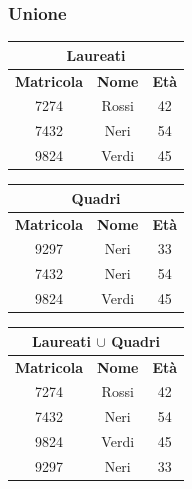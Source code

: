 \documentclass[../main.tex]{subfiles}
\begin{document}
	\subsubsection{Unione}
	\begin{center}
		\begin{tabular}{ |c|c|c| }
			\hline
			\multicolumn{3}{|c|}{\textbf{Laureati}}\\
			\hline
			\textbf{Matricola} & \textbf{Nome} & \textbf{Età}\\
			\hline
			7274 & Rossi & 42\\
			7432 & Neri & 54\\
			9824 & Verdi & 45\\
			\hline
		\end{tabular}
		\begin{tabular}{|c|c|c|}
			\hline
			\multicolumn{3}{|c|}{\textbf{Quadri}}\\
			\hline
			\textbf{Matricola} & \textbf{Nome} & \textbf{Età}\\
			\hline
			9297 & Neri & 33\\
			7432 & Neri & 54\\
			9824 & Verdi & 45\\
			\hline
		\end{tabular}
	\end{center}
	\begin{center}
		\begin{tabular}{|c|c|c|}
			\hline
			\multicolumn{3}{|c|}{\textbf{Laureati $\cup$ Quadri}}\\
			\hline
			\textbf{Matricola} & \textbf{Nome} & \textbf{Età}\\
			\hline
			7274 & Rossi & 42\\
			7432 & Neri & 54\\
			9824 & Verdi & 45\\
			9297 & Neri & 33\\
			\hline
		\end{tabular}
	\end{center}
\end{document}
